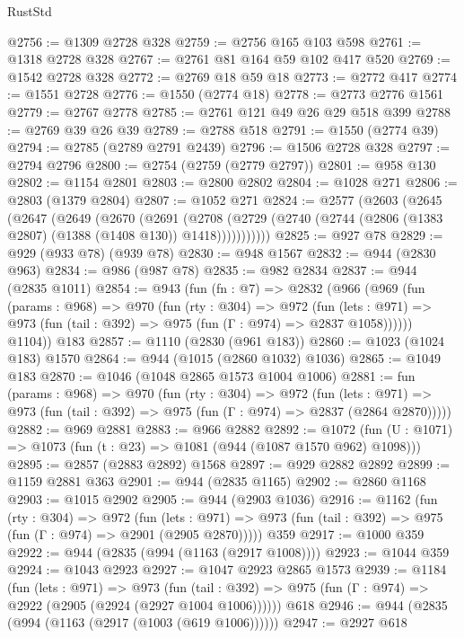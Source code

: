 \begin{lexlean}{RustStd}
\begin{coremodule}
{\begin{coremodule}
{{{{{{{{{{@2756 := @1309 @2728 @328
@2759 := @2756 @165 @103 @598
@2761 := @1318 @2728 @328
@2767 := @2761 @81 @164 @59 @102 @417 @520
@2769 := @1542 @2728 @328
@2772 := @2769 @18 @59 @18
@2773 := @2772 @417
@2774 := @1551 @2728
@2776 := @1550 (@2774 @18)
@2778 := @2773 @2776 @1561
@2779 := @2767 @2778
@2785 := @2761 @121 @49 @26 @29 @518 @399
@2788 := @2769 @39 @26 @39
@2789 := @2788 @518
@2791 := @1550 (@2774 @39)
@2794 := @2785 (@2789 @2791 @2439)
@2796 := @1506 @2728 @328
@2797 := @2794 @2796
@2800 := @2754 (@2759 (@2779 @2797))
@2801 := @958 @130
@2802 := @1154 @2801
@2803 := @2800 @2802
@2804 := @1028 @271
@2806 := @2803 (@1379 @2804)
@2807 := @1052 @271
@2824 := @2577
    (@2603
      (@2645
        (@2647
          (@2649
            (@2670
              (@2691
                (@2708
                  (@2729 (@2740 (@2744 (@2806 (@1383 @2807) (@1388 (@1408 @130)) @1418)))))))))))
@2825 := @927 @78
@2829 := @929 (@933 @78) (@939 @78)
@2830 := @948 @1567
@2832 := @944 (@2830 @963)
@2834 := @986 (@987 @78)
@2835 := @982 @2834
@2837 := @944 (@2835 @1011)
@2854 := @943
    (fun (fn : @7) =>
    @2832
      (@966
        (@969
          (fun (params : @968) =>
          @970
            (fun (rty : @304) =>
            @972
              (fun (lets : @971) =>
              @973 (fun (tail : @392) => @975 (fun (Γ : @974) => @2837 @1058))))))
        @1104))
    @183
@2857 := @1110 (@2830 (@961 @183))
@2860 := @1023 (@1024 @183) @1570
@2864 := @944 (@1015 (@2860 @1032) @1036)
@2865 := @1049 @183
@2870 := @1046 (@1048 @2865 @1573 @1004 @1006)
@2881 := fun (params : @968) =>
  @970
    (fun (rty : @304) =>
    @972
      (fun (lets : @971) =>
      @973 (fun (tail : @392) => @975 (fun (Γ : @974) => @2837 (@2864 @2870)))))
@2882 := @969 @2881
@2883 := @966 @2882
@2892 := @1072 (fun (U : @1071) => @1073 (fun (t : @23) => @1081 (@944 (@1087 @1570 @962) @1098)))
@2895 := @2857 (@2883 @2892) @1568
@2897 := @929 @2882 @2892
@2899 := @1159 @2881 @363
@2901 := @944 (@2835 @1165)
@2902 := @2860 @1168
@2903 := @1015 @2902
@2905 := @944 (@2903 @1036)
@2916 := @1162
    (fun (rty : @304) =>
    @972
      (fun (lets : @971) =>
      @973 (fun (tail : @392) => @975 (fun (Γ : @974) => @2901 (@2905 @2870)))))
    @359
@2917 := @1000 @359
@2922 := @944 (@2835 (@994 (@1163 (@2917 @1008))))
@2923 := @1044 @359
@2924 := @1043 @2923
@2927 := @1047 @2923 @2865 @1573
@2939 := @1184
    (fun (lets : @971) =>
    @973 (fun (tail : @392) => @975 (fun (Γ : @974) => @2922 (@2905 (@2924 (@2927 @1004 @1006))))))
    @618
@2946 := @944 (@2835 (@994 (@1163 (@2917 (@1003 (@619 @1006))))))
@2947 := @2927 @618
}}}}}}}}}}
\end{coremodule}}
\end{coremodule}
\end{lexlean}
